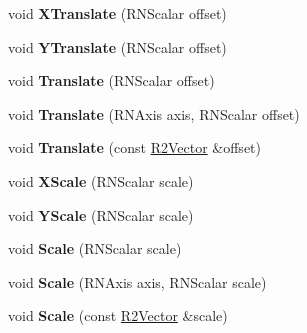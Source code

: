 \begin{DoxyCompactItemize}
\item 
void {\bfseries X\+Translate} (R\+N\+Scalar offset)\hypertarget{class_r3_matrix_aa63c6da972cf35c48b9929f2a812dc0c}{}\label{class_r3_matrix_aa63c6da972cf35c48b9929f2a812dc0c}

\item 
void {\bfseries Y\+Translate} (R\+N\+Scalar offset)\hypertarget{class_r3_matrix_a549255b7b1c092452bbc8a0cbf371f8b}{}\label{class_r3_matrix_a549255b7b1c092452bbc8a0cbf371f8b}

\item 
void {\bfseries Translate} (R\+N\+Scalar offset)\hypertarget{class_r3_matrix_a19af9c74b0d99ede124294c4ac5680b0}{}\label{class_r3_matrix_a19af9c74b0d99ede124294c4ac5680b0}

\item 
void {\bfseries Translate} (R\+N\+Axis axis, R\+N\+Scalar offset)\hypertarget{class_r3_matrix_af1185d947fa58276242861d7f76e0f2b}{}\label{class_r3_matrix_af1185d947fa58276242861d7f76e0f2b}

\item 
void {\bfseries Translate} (const \hyperlink{class_r2_vector}{R2\+Vector} \&offset)\hypertarget{class_r3_matrix_a64b7c57d19ff927939fd59f31b32c456}{}\label{class_r3_matrix_a64b7c57d19ff927939fd59f31b32c456}

\item 
void {\bfseries X\+Scale} (R\+N\+Scalar scale)\hypertarget{class_r3_matrix_ae99d1c9ffeb480f0523aaa1f9b1cb862}{}\label{class_r3_matrix_ae99d1c9ffeb480f0523aaa1f9b1cb862}

\item 
void {\bfseries Y\+Scale} (R\+N\+Scalar scale)\hypertarget{class_r3_matrix_a8b5559a983f040223a274bafc73b3419}{}\label{class_r3_matrix_a8b5559a983f040223a274bafc73b3419}

\item 
void {\bfseries Scale} (R\+N\+Scalar scale)\hypertarget{class_r3_matrix_a2a0f429c0c43232bf251d510453de12e}{}\label{class_r3_matrix_a2a0f429c0c43232bf251d510453de12e}

\item 
void {\bfseries Scale} (R\+N\+Axis axis, R\+N\+Scalar scale)\hypertarget{class_r3_matrix_a0d8b42302648658e76b04db2430a223b}{}\label{class_r3_matrix_a0d8b42302648658e76b04db2430a223b}

\item 
void {\bfseries Scale} (const \hyperlink{class_r2_vector}{R2\+Vector} \&scale)\hypertarget{class_r3_matrix_acd3cacba1c6608d033d78cf8d0c4442c}{}\label{class_r3_matrix_acd3cacba1c6608d033d78cf8d0c4442c}


\end{DoxyCompactItemize}
